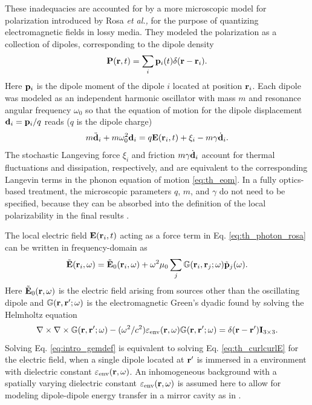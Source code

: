 These inadequacies are accounted for by a more microscopic model for polarization introduced by Rosa \textit{et al.,} \cite{rosa10,rosa11} for the purpose of quantizing electromagnetic fields in lossy media. They modeled the polarization as a collection of dipoles, corresponding to the dipole density
\begin{equation}
 \mathbf{P}(\mathbf{r},t) = \sum_i \mathbf{p}_i(t) \delta(\mathbf{r}-\mathbf{r}_i).
\end{equation}
Here $\mathbf{p}_i$ is the dipole moment of the dipole $i$ located at position $\mathbf{r}_i$. Each dipole was modeled as an independent harmonic oscillator with mass $m$ and resonance angular frequency $\omega_0$ so that the equation of motion for the dipole displacement $\mathbf{d}_i=\mathbf{p}_i/q$ reads ($q$ is the dipole charge) \cite{rosa10,rosa11}
\begin{equation}
 m\ddot{\mathbf{d}}_i + m\omega_0^2 \mathbf{d}_i = q\mathbf{E}(\mathbf{r}_i,t) + \xi_i - m\gamma \dot{\mathbf{d}}_i. \label{eq:th_photon_rosa}
\end{equation}
The stochastic Langeving force $\xi_i$ and friction $m\gamma \dot{\mathbf{d}}_i$ account for thermal fluctuations and dissipation, respectively, and are equivalent to the corresponding Langevin terms in the phonon equation of motion \eqref{eq:th_eom}. In a fully optics-based treatment, the microscopic parameters $q$, $m$, and $\gamma$ do not need to be specified, because they can be absorbed into the definition of the local polarizability in the final results \cite{rosa10}.

The local electric field $\mathbf{E}(\mathbf{r}_i,t)$ acting as a force term in Eq. \eqref{eq:th_photon_rosa} can be written in frequency-domain as \cite{novotny,rosa11}
\begin{equation}
\tilde {\mathbf{E}}(\mathbf{r}_i,\omega) = \tilde {\mathbf{E}}_0(\mathbf{r}_i,\omega) + \omega^2 \mu_0 \sum_j \mathbb{G}(\mathbf{r}_i,\mathbf{r}_j;\omega) \tilde{\mathbf{p}}_j(\omega). \label{eq:th_Etilde}
\end{equation}
Here $\tilde{\mathbf{E}}_0(\mathbf{r},\omega)$ is the electric field arising from sources other than the oscillating dipole and $\mathbb{G}(\mathbf{r},\mathbf{r}';\omega)$ is the electromagnetic Green's dyadic found by solving the Helmholtz equation \cite{novotny}
 \begin{equation}
 \nabla \times \nabla \times \mathbb{G}(\mathbf{r},\mathbf{r}';\omega) - (\omega^2/c^2) \varepsilon_{\textrm{env}}(\mathbf{r},\omega)\mathbb{G}(\mathbf{r},\mathbf{r}';\omega)  =  \delta(\mathbf{r}-\mathbf{r}')\mathbf{I}_{3 \times 3}. \label{eq:intro_gemdef}
\end{equation}
Solving Eq. \eqref{eq:intro_gemdef} is equivalent to solving Eq. \eqref{eq:th_curlcurlE} for the electric field, when a single dipole located at $\mathbf{r}'$ is immersed in a environment with dielectric constant $\varepsilon_{\textrm{env}}(\mathbf{r},\omega)$. An inhomogeneous background with a spatially varying dielectric constant $\varepsilon_{\textrm{env}}(\mathbf{r},\omega)$ is assumed here to allow for modeling dipole-dipole energy transfer in a mirror cavity as in .

